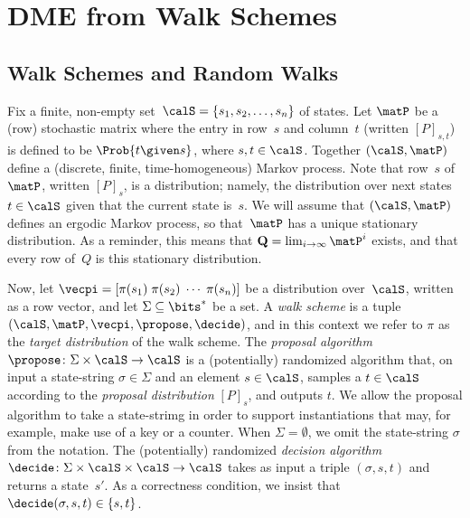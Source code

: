 
\section{DME from Walk Schemes}
\subsection{Walk Schemes and Random Walks}
Fix a finite, non-empty set~$\calS=\{s_1,s_2,\ldots,s_n\}$ of states.
Let $\matP$ be a (row) stochastic matrix where the entry in row~$s$
and column~$t$ (written $[P]_{s,t}$) is defined to be $\Prob{t
  \given s}$, where $s,t\in\calS$.
Together $(\calS,\matP)$ define a
  (discrete, finite, time-homogeneous) Markov process.
  Note that row~$s$ of~$\matP$,
written $[P]_{s}$, is a distribution; namely, the distribution over next
states~$t \in \calS$ given that the current state is~$s$.  We will
assume that $(\calS,\matP)$ defines an ergodic Markov process, so
that~$\matP$ has a unique stationary distribution.  As a reminder,
this means that $\mathbf{Q} = \lim_{i\to\infty}\matP^i$ exists, and
that every row of~$Q$ is this stationary distribution.  

Now, let $\vecpi=[\pi(s_1) \; \pi(s_2) \; \cdots \; \pi(s_n)]$ be a
distribution over~$\calS$, written as a row vector, and let $\Sigma \subseteq \bits^*$ be a set.  
A \textit{walk scheme} is a tuple
$(\calS,\matP,\vecpi,\propose,\decide)$, and in this context we refer
to $\pi$ as the \textit{target distribution} of the walk scheme.  
%
The \textit{proposal algorithm} $\propose \colon \Sigma\times\calS \to \calS$
is a (potentially) randomized algorithm that, on input a state-string
$\sigma\in\Sigma$ and an element $s\in\calS$, samples a $t\in\calS$
according to the \textit{proposal distribution} $[P]_s$, and outputs $t$.  
We allow the proposal algorithm to take a state-strimg in order to support instantiations that may,
for example, make use of a key or a counter.
When $\Sigma=\emptyset$, we omit the state-string $\sigma$ from
the notation.  
%
The
(potentially) randomized
\textit{decision algorithm} $\decide \colon \Sigma \times \calS \times \calS \to
\calS$ takes as input a triple $(\sigma,s,t)$ and returns a state~$s'$.  As a
correctness condition, we insist that $\decide(\sigma,s,t) \in \{s,t\}$.  

